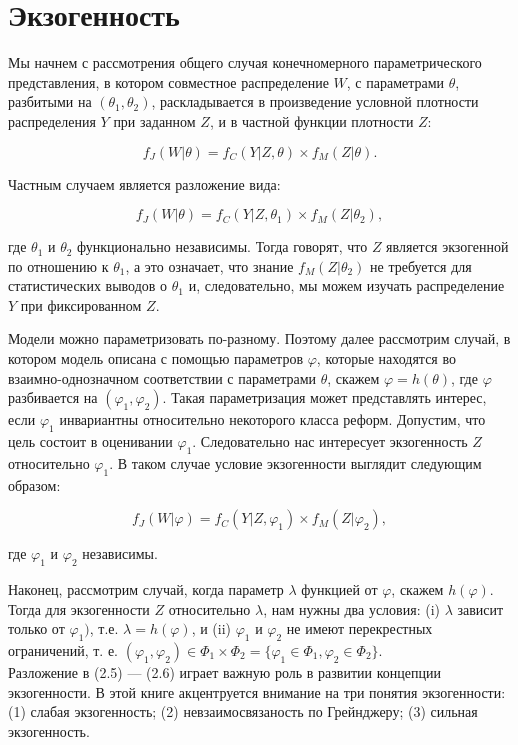 	
\section{Экзогенность}

	
Мы начнем с рассмотрения общего случая конечномерного параметрического представления, в котором совместное распределение $W$, с параметрами $\theta$, разбитыми на $(\theta_{1},\theta_{2})$, раскладывается в произведение условной плотности распределения $Y$ при заданном $Z$, и в частной функции плотности $Z$:


\begin{equation}
f_{J}(W|\theta)=f_{C}(Y|Z,\theta)\times f_{M}(Z|\theta).
\end{equation}

Частным случаем является разложение вида:

\[
f_{J}(W|\theta)=f_{C}(Y|Z,\theta_{1})\times f_{M}(Z|\theta_{2}),
\]

где $ \theta_{1} $ и $ \theta_{2} $ функционально независимы. Тогда говорят, что $Z$ является экзогенной по отношению к  $ \theta_{1} $, а это означает, что знание $ f_{M}(Z|\theta_{2}) $  не требуется для статистических выводов о $ \theta_{1}$ и, следовательно, мы можем изучать распределение $Y$ при фиксированном  $Z$. 


Модели можно параметризовать по-разному. Поэтому далее рассмотрим случай, в котором модель описана с помощью параметров $\varphi$, которые находятся во  взаимно-однозначном соответствии с параметрами $\theta$, скажем $\varphi=h(\theta)$, где $\varphi$ разбивается на $(\varphi_{1},\varphi_{2})$. Такая параметризация может представлять интерес, если $\varphi_1$ инвариантны относительно некоторого класса реформ. Допустим, что цель состоит в оценивании $\varphi_1$. Следовательно нас интересует экзогенность $Z$ относительно $\varphi_1$. В таком случае условие экзогенности выглядит следующим образом:
	
\begin{equation}
f_{J}(W|\varphi)=f_{C}(Y|Z,\varphi_{1})\times f_{M}(Z|\varphi_{2}),
\end{equation}

где $\varphi_{1}$ и $\varphi_{2}$ независимы.

Наконец, рассмотрим случай, когда параметр $\lambda$ функцией от $\varphi$, скажем $h(\varphi)$. Тогда для экзогенности $Z$ относительно $\lambda$, нам нужны два условия: (i) $\lambda$ зависит только от $ \varphi_{1}) $, т.е. $\lambda=h(\varphi)$, и (ii) $\varphi_{1}$ и $\varphi_{2}$ не имеют перекрестных ограничений, т. е. $(\varphi_{1}, \varphi_{2}) \in \Phi_{1}\times\Phi_{2} = \lbrace\varphi_{1} \in \Phi_{1}, \varphi_{2} \in \Phi_{2}\rbrace$. \\
Разложение в (2.5) --- (2.6) играет важную роль в развитии концепции экзогенности. В этой книге акцентруется внимание на три понятия экзогенности: (1) слабая экзогенность; (2) невзаимосвязаность по Грейнджеру; (3) сильная экзогенность.

